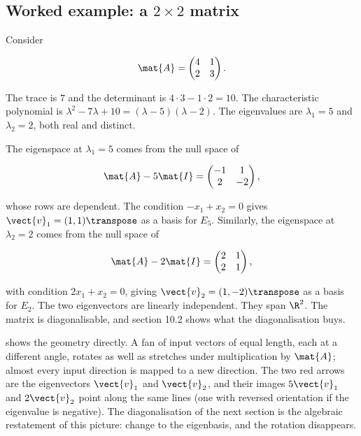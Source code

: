 \subsection{Worked example: a $2 \times 2$ matrix}

Consider

\[
\mat{A} = \begin{pmatrix} 4 & 1 \\ 2 & 3 \end{pmatrix}.
\]

The trace is $7$ and the determinant is $4 \cdot 3 - 1 \cdot 2 =
10$. The characteristic polynomial is $\lambda^{2} - 7\lambda + 10 =
(\lambda - 5)(\lambda - 2)$. The eigenvalues are $\lambda_{1} = 5$
and $\lambda_{2} = 2$, both real and distinct.

The eigenspace at $\lambda_{1} = 5$ comes from the null space of

\[
\mat{A} - 5 \mat{I} = \begin{pmatrix} -1 & 1 \\ 2 & -2 \end{pmatrix},
\]

whose rows are dependent. The condition $-x_{1} + x_{2} = 0$ gives
$\vect{v}_{1} = (1, 1)\transpose$ as a basis for $E_{5}$. Similarly,
the eigenspace at $\lambda_{2} = 2$ comes from the null space of

\[
\mat{A} - 2 \mat{I} = \begin{pmatrix} 2 & 1 \\ 2 & 1 \end{pmatrix},
\]

with condition $2 x_{1} + x_{2} = 0$, giving $\vect{v}_{2} = (1, -2)
\transpose$ as a basis for $E_{2}$. The two eigenvectors are
linearly independent. They span $\R^{2}$. The matrix is
diagonalisable, and section 10.2 shows what the diagonalisation
buys.



 shows the geometry directly.
A fan of input vectors of equal length, each at a different angle,
rotates as well as stretches under multiplication by $\mat{A}$;
almost every input direction is mapped to a new direction. The two
red arrows are the eigenvectors $\vect{v}_{1}$ and $\vect{v}_{2}$,
and their images $5\vect{v}_{1}$ and $2\vect{v}_{2}$ point along the
same lines (one with reversed orientation if the eigenvalue is
negative). The diagonalisation of the next section is the algebraic
restatement of this picture: change to the eigenbasis, and the
rotation disappears.

